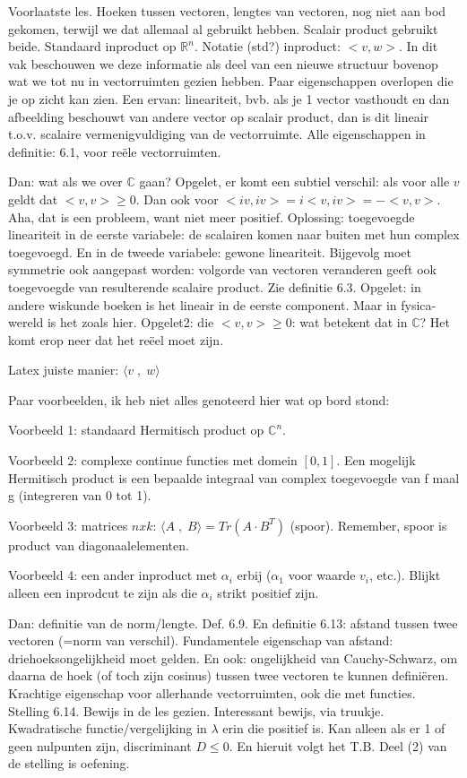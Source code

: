 \documentclass{article}
\begin{document}
Voorlaatste les. 
Hoeken tussen vectoren, lengtes van vectoren, nog niet aan bod gekomen, terwijl we dat allemaal al gebruikt hebben. Scalair product gebruikt beide. Standaard inproduct op $\mathbb{R}^n$. Notatie (std?) inproduct: $<v,w>$. In dit vak beschouwen we deze informatie als deel van een nieuwe structuur bovenop wat we tot nu in vectorruimten gezien hebben. 
Paar eigenschappen overlopen die je op zicht kan zien. Een ervan: lineariteit, bvb. als je 1 vector vasthoudt en dan afbeelding beschouwt van andere vector op scalair product, dan is dit lineair t.o.v. scalaire vermenigvuldiging van de vectorruimte. 
Alle eigenschappen in definitie: 6.1, voor re\"ele vectorruimten. 

Dan: wat als we over $\mathbb{C}$ gaan? Opgelet, er komt een subtiel verschil: als voor alle $v$ geldt dat $<v,v> \geq 0$. Dan ook voor $<iv, iv> = i<v,iv> = -<v,v>$. Aha, dat is een probleem, want niet meer positief. 
Oplossing: toegevoegde lineariteit in de eerste variabele: de scalairen komen naar buiten met hun complex toegevoegd. En in de tweede variabele: gewone lineariteit. Bijgevolg moet symmetrie ook aangepast worden: volgorde van vectoren veranderen geeft ook toegevoegde van resulterende scalaire product. 
Zie definitie 6.3. 
Opgelet: in andere wiskunde boeken is het lineair in de eerste component. Maar in fysica-wereld is het zoals hier. 
Opgelet2: die $<v,v> \geq 0$: wat betekent dat in $\mathbb{C}$? Het komt erop neer dat het re\"eel moet zijn. 

Latex juiste manier: $\langle v \; , \; w \rangle$

Paar voorbeelden, ik heb niet alles genoteerd hier wat op bord stond: 

Voorbeeld 1: standaard Hermitisch product op $\mathbb{C}^n$. 

Voorbeeld 2: complexe continue functies met domein $[0,1]$. Een mogelijk Hermitisch product is een bepaalde integraal van complex toegevoegde van f maal g (integreren van 0 tot 1). 

Voorbeeld 3: matrices $nxk$: $\langle A \; , \; B \rangle = Tr(A \cdot B^T) $ (spoor). Remember, spoor is product van diagonaalelementen. 

Voorbeeld 4: een ander inproduct met $\alpha_i$ erbij ($\alpha_1$ voor waarde $v_i$, etc.). Blijkt alleen een inprodcut te zijn als die $\alpha_i$ strikt positief zijn. 

Dan: definitie van de norm/lengte. Def. 6.9. En definitie 6.13: afstand tussen twee vectoren (=norm van verschil). 
Fundamentele eigenschap van afstand: driehoeksongelijkheid moet gelden. En ook: ongelijkheid van Cauchy-Schwarz, om daarna de hoek (of toch zijn cosinus) tussen twee vectoren te kunnen defini\"eren. Krachtige eigenschap voor allerhande vectorruimten, ook die met functies. Stelling 6.14. 
Bewijs in de les gezien. Interessant bewijs, via truukje. Kwadratische functie/vergelijking in $\lambda$ erin die positief is. Kan alleen als er 1 of geen nulpunten zijn, discriminant $D \leq 0$. En hieruit volgt het T.B. Deel (2) van de stelling is oefening. 
\end{document}
